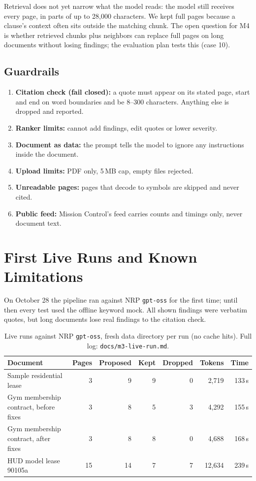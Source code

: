 \documentclass[11pt,letterpaper]{article}
\newcommand{\code}[1]{\texttt{#1}}
\begin{document}
Retrieval does not yet narrow what the model reads: the model still receives every page, in parts of up to 28,000 characters. We kept full pages because a clause's context often sits outside the matching chunk. The open question for M4 is whether retrieved chunks plus neighbors can replace full pages on long documents without losing findings; the evaluation plan tests this (case 10).

\subsection{Guardrails}

\begin{enumerate}
  \item \textbf{Citation check (fail closed):} a quote must appear on its stated page, start and end on word boundaries and be 8--300 characters. Anything else is dropped and reported.
  \item \textbf{Ranker limits:} cannot add findings, edit quotes or lower severity.
  \item \textbf{Document as data:} the prompt tells the model to ignore any instructions inside the document.
  \item \textbf{Upload limits:} PDF only, 5\,MB cap, empty files rejected.
  \item \textbf{Unreadable pages:} pages that decode to symbols are skipped and never cited.
  \item \textbf{Public feed:} Mission Control's feed carries counts and timings only, never document text.
\end{enumerate}

\section{First Live Runs and Known Limitations}

On October 28 the pipeline ran against NRP \code{gpt-oss} for the first time; until then every test used the offline keyword mock. All shown findings were verbatim quotes, but long documents lose real findings to the citation check.

\begin{table}[htbp]
\centering
\small
\begin{tabularx}{\textwidth}{@{}Lrrrrrr@{}}
\toprule
\textbf{Document} & \textbf{Pages} & \textbf{Proposed} & \textbf{Kept} & \textbf{Dropped} & \textbf{Tokens} & \textbf{Time} \\
\midrule
Sample residential lease & 3 & 9 & 9 & 0 & 2,719 & 133\,s \\
Gym membership contract, before fixes & 3 & 8 & 5 & 3 & 4,292 & 155\,s \\
Gym membership contract, after fixes & 3 & 8 & 8 & 0 & 4,688 & 168\,s \\
HUD model lease 90105a & 15 & 14 & 7 & 7 & 12,634 & 239\,s \\
\bottomrule
\end{tabularx}
\caption{Live runs against NRP \code{gpt-oss}, fresh data directory per run (no cache hits). Full log: \code{docs/m3-live-run.md}.}
\end{table}
\end{document}
